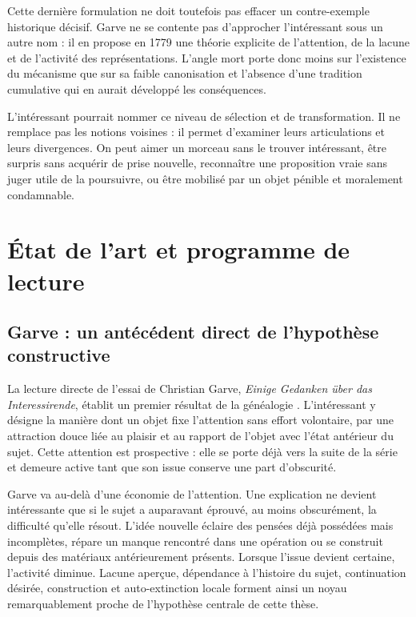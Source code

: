 \documentclass[11pt,a4paper]{article}
\begin{document}
Cette dernière formulation ne doit toutefois pas effacer un contre-exemple
historique décisif. Garve ne se contente pas d'approcher l'intéressant sous un
autre nom : il en propose en 1779 une théorie explicite de l'attention, de la
lacune et de l'activité des représentations. L'angle mort porte donc moins sur
l'existence du mécanisme que sur sa faible canonisation et l'absence d'une
tradition cumulative qui en aurait développé les conséquences.

L'intéressant pourrait nommer ce niveau de sélection et de transformation. Il ne
remplace pas les notions voisines : il permet d'examiner leurs articulations et
leurs divergences. On peut aimer un morceau sans le trouver intéressant, être
surpris sans acquérir de prise nouvelle, reconnaître une proposition vraie sans
juger utile de la poursuivre, ou être mobilisé par un objet pénible et
moralement condamnable.

\section{État de l'art et programme de lecture}

\subsection{Garve : un antécédent direct de l'hypothèse constructive}

La lecture directe de l'essai de Christian Garve, \emph{Einige Gedanken über
das Interessirende}, établit un premier résultat de la généalogie
\parencite[253--274, 313--317]{garve1779interessirende}. L'intéressant y désigne
la manière dont un objet fixe l'attention sans effort volontaire, par une
attraction douce liée au plaisir et au rapport de l'objet avec l'état antérieur
du sujet. Cette attention est prospective : elle se porte déjà vers la suite de
la série et demeure active tant que son issue conserve une part d'obscurité.

Garve va au-delà d'une économie de l'attention. Une explication ne devient
intéressante que si le sujet a auparavant éprouvé, au moins obscurément, la
difficulté qu'elle résout. L'idée nouvelle éclaire des pensées déjà possédées
mais incomplètes, répare un manque rencontré dans une opération ou se construit
depuis des matériaux antérieurement présents. Lorsque l'issue devient certaine,
l'activité diminue. Lacune aperçue, dépendance à l'histoire du sujet,
continuation désirée, construction et auto-extinction locale forment ainsi un
noyau remarquablement proche de l'hypothèse centrale de cette thèse.
\end{document}
